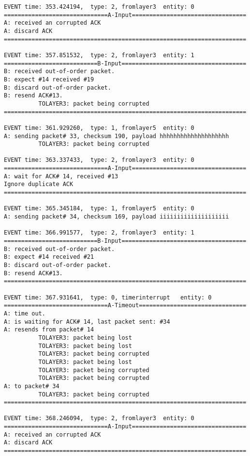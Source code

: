 \documentclass[12pt]{article}
\begin{document}
\begin{verbatim}
EVENT time: 353.424194,  type: 2, fromlayer3  entity: 0
==============================A-Input=================================
A: received an corrupted ACK 
A: discard ACK
======================================================================

EVENT time: 357.851532,  type: 2, fromlayer3  entity: 1
===========================B-Input====================================
B: received out-of-order packet.
B: expect #14 received #19
B: discard out-of-order packet.
B: resend ACK#13.
          TOLAYER3: packet being corrupted
======================================================================

EVENT time: 361.929260,  type: 1, fromlayer5  entity: 0
A: sending packet# 33, checksum 190, payload hhhhhhhhhhhhhhhhhhhh
          TOLAYER3: packet being corrupted

EVENT time: 363.337433,  type: 2, fromlayer3  entity: 0
==============================A-Input=================================
A: wait for ACK# 14, received #13
Ignore duplicate ACK
======================================================================

EVENT time: 365.345184,  type: 1, fromlayer5  entity: 0
A: sending packet# 34, checksum 169, payload iiiiiiiiiiiiiiiiiiii

EVENT time: 366.991577,  type: 2, fromlayer3  entity: 1
===========================B-Input====================================
B: received out-of-order packet.
B: expect #14 received #21
B: discard out-of-order packet.
B: resend ACK#13.
======================================================================

EVENT time: 367.931641,  type: 0, timerinterrupt   entity: 0
==============================A-Timeout===============================
A: time out. 
A: is waiting for ACK# 14, last packet sent: #34
A: resends from packet# 14 
          TOLAYER3: packet being lost
          TOLAYER3: packet being lost
          TOLAYER3: packet being corrupted
          TOLAYER3: packet being lost
          TOLAYER3: packet being corrupted
          TOLAYER3: packet being corrupted
A: to packet# 34
          TOLAYER3: packet being corrupted
======================================================================

EVENT time: 368.246094,  type: 2, fromlayer3  entity: 0
==============================A-Input=================================
A: received an corrupted ACK 
A: discard ACK
======================================================================


\end{verbatim}
\end{document}
